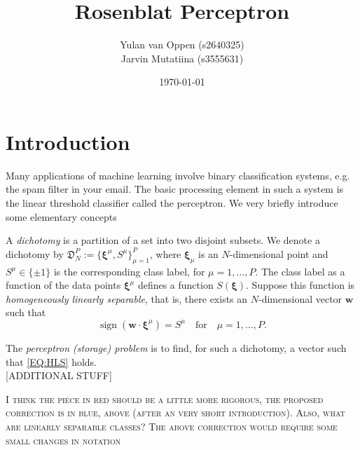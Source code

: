 \documentclass{article}
\title{Rosenblat Perceptron}
\author{Yulan van Oppen (s2640325)\\
Jarvin Mutatiina (s3555631) \\ 
}
\date{\today}
\def\*#1{\mathbf{#1}}
\def\q{\quad}
\def\t#1{\text{#1}}
\def\bxi{\boldsymbol{\xi}}
\DeclareMathOperator{\sign}{sign}
\begin{document}
\maketitle

\section{Introduction}
{\color{blue}
Many applications of machine learning involve binary classification systems, e.g. the spam filter in your email. The basic processing element in such a system is the linear threshold classifier called the perceptron. We very briefly introduce some elementary concepts 

A \textit{dichotomy} is a partition of a set into two disjoint subsets. We denote a dichotomy by $\mathfrak{D}_N^P := \{\bxi^\mu, S^\mu\}_{\mu = 1}^P$, where $\bxi_\mu$ is an $N$-dimensional point and $S^\mu \in \{\pm 1\}$ is the corresponding class label, for $\mu = 1, \ldots, P$. The class label as a function of the data points $\bxi^\mu$ defines a function $S(\bxi)$. Suppose this function is \textit{homogeneously linearly separable}, that is, there exists an $N$-dimensional vector $\*w$ such that
\begin{equation}
	\label{EQ:HLS} \sign(\*w \cdot \bxi^\mu) = S^\mu \q \t{for} \q \mu = 1, \ldots, P.
\end{equation}

The \textit{perceptron (storage) problem} is to find, for such a dichotomy, a vector such that \eqref{EQ:HLS} holds.\\

[ADDITIONAL STUFF]\\}

{\color{orange} \textsc{I think the piece in red should be a little more rigorous, the proposed correction is in blue, above (after an very short introduction). Also, what are linearly separable classes? The above correction would require some small changes in notation} \\}
\end{document}

